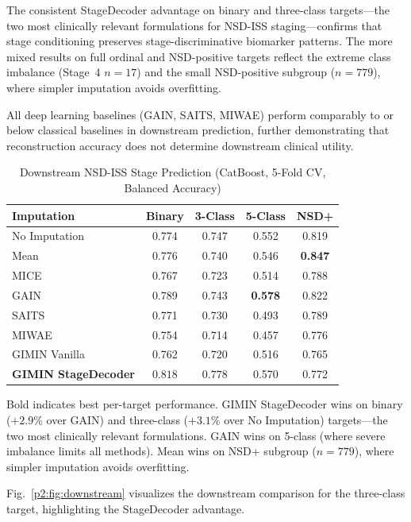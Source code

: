 The consistent StageDecoder advantage on binary and three-class targets---the two most clinically relevant formulations for NSD-ISS staging---confirms that stage conditioning preserves stage-discriminative biomarker patterns. The more mixed results on full ordinal and NSD-positive targets reflect the extreme class imbalance (Stage~4 $n = 17$) and the small NSD-positive subgroup ($n = 779$), where simpler imputation avoids overfitting.

All deep learning baselines (GAIN, SAITS, MIWAE) perform comparably to or below classical baselines in downstream prediction, further demonstrating that reconstruction accuracy does not determine downstream clinical utility.

\begin{table}[!t]
\caption{Downstream NSD-ISS Stage Prediction (CatBoost, 5-Fold CV, Balanced Accuracy)}
\label{p2:tab:downstream}
\centering
\footnotesize
\setlength{\tabcolsep}{2.5pt}
\begin{tabular}{@{}lcccc@{}}
\toprule
\textbf{Imputation} & \textbf{Binary} & \textbf{3-Class} & \textbf{5-Class} & \textbf{NSD+} \\
\midrule
No Imputation & 0.774 & 0.747 & 0.552 & 0.819 \\
Mean & 0.776 & 0.740 & 0.546 & \textbf{0.847} \\
MICE & 0.767 & 0.723 & 0.514 & 0.788 \\
\midrule
GAIN & 0.789 & 0.743 & \textbf{0.578} & 0.822 \\
SAITS & 0.771 & 0.730 & 0.493 & 0.789 \\
MIWAE & 0.754 & 0.714 & 0.457 & 0.776 \\
\midrule
GIMIN Vanilla & 0.762 & 0.720 & 0.516 & 0.765 \\
\textbf{GIMIN StageDecoder} & $\mathbf{0.818}$ & $\mathbf{0.778}$ & 0.570 & 0.772 \\
\bottomrule
\end{tabular}
\vspace{2pt}
\parbox{\columnwidth}{\scriptsize Bold indicates best per-target performance. GIMIN StageDecoder wins on binary ($+2.9\%$ over GAIN) and three-class ($+3.1\%$ over No Imputation) targets---the two most clinically relevant formulations. GAIN wins on 5-class (where severe imbalance limits all methods). Mean wins on NSD+ subgroup ($n = 779$), where simpler imputation avoids overfitting.}
\end{table}

Fig.~\ref{p2:fig:downstream} visualizes the downstream comparison for the three-class target, highlighting the StageDecoder advantage.

